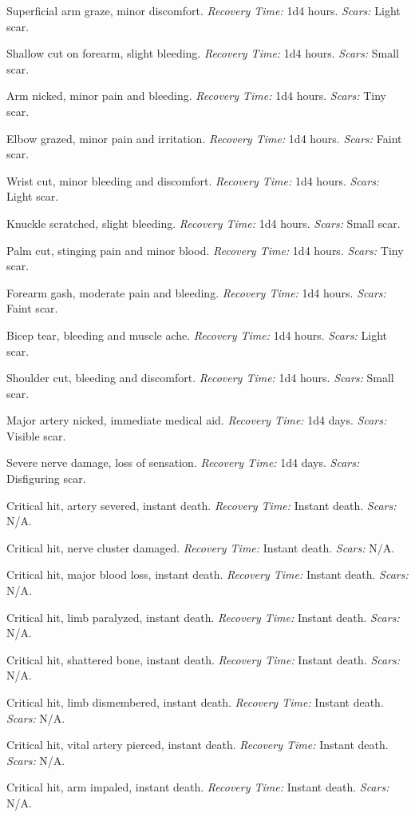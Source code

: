 \begin{description}[labelwidth=1.5em, leftmargin=*, itemsep=0.4em]
    \item[1 -] Superficial arm graze, minor discomfort. \textit{Recovery Time:} 1d4 hours. \textit{Scars:} Light scar.
    \item[2 -] Shallow cut on forearm, slight bleeding. \textit{Recovery Time:} 1d4 hours. \textit{Scars:} Small scar.
    \item[3 -] Arm nicked, minor pain and bleeding. \textit{Recovery Time:} 1d4 hours. \textit{Scars:} Tiny scar.
    \item[4 -] Elbow grazed, minor pain and irritation. \textit{Recovery Time:} 1d4 hours. \textit{Scars:} Faint scar.
    \item[5 -] Wrist cut, minor bleeding and discomfort. \textit{Recovery Time:} 1d4 hours. \textit{Scars:} Light scar.
    \item[6 -] Knuckle scratched, slight bleeding. \textit{Recovery Time:} 1d4 hours. \textit{Scars:} Small scar.
    \item[7 -] Palm cut, stinging pain and minor blood. \textit{Recovery Time:} 1d4 hours. \textit{Scars:} Tiny scar.
    \item[8 -] Forearm gash, moderate pain and bleeding. \textit{Recovery Time:} 1d4 hours. \textit{Scars:} Faint scar.
    \item[9 -] Bicep tear, bleeding and muscle ache. \textit{Recovery Time:} 1d4 hours. \textit{Scars:} Light scar.
    \item[10 -] Shoulder cut, bleeding and discomfort. \textit{Recovery Time:} 1d4 hours. \textit{Scars:} Small scar.
    \item[11 -] Major artery nicked, immediate medical aid. \textit{Recovery Time:} 1d4 days. \textit{Scars:} Visible scar.
    \item[12 -] Severe nerve damage, loss of sensation. \textit{Recovery Time:} 1d4 days. \textit{Scars:} Disfiguring scar.
    \item[13 -] Critical hit, artery severed, instant death. \textit{Recovery Time:} Instant death. \textit{Scars:} N/A.
    \item[14 -] Critical hit, nerve cluster damaged. \textit{Recovery Time:} Instant death. \textit{Scars:} N/A.
    \item[15 -] Critical hit, major blood loss, instant death. \textit{Recovery Time:} Instant death. \textit{Scars:} N/A.
    \item[16 -] Critical hit, limb paralyzed, instant death. \textit{Recovery Time:} Instant death. \textit{Scars:} N/A.
    \item[17 -] Critical hit, shattered bone, instant death. \textit{Recovery Time:} Instant death. \textit{Scars:} N/A.
    \item[18 -] Critical hit, limb dismembered, instant death. \textit{Recovery Time:} Instant death. \textit{Scars:} N/A.
    \item[19 -] Critical hit, vital artery pierced, instant death. \textit{Recovery Time:} Instant death. \textit{Scars:} N/A.
    \item[20 -] Critical hit, arm impaled, instant death. \textit{Recovery Time:} Instant death. \textit{Scars:} N/A.
\end{description}

